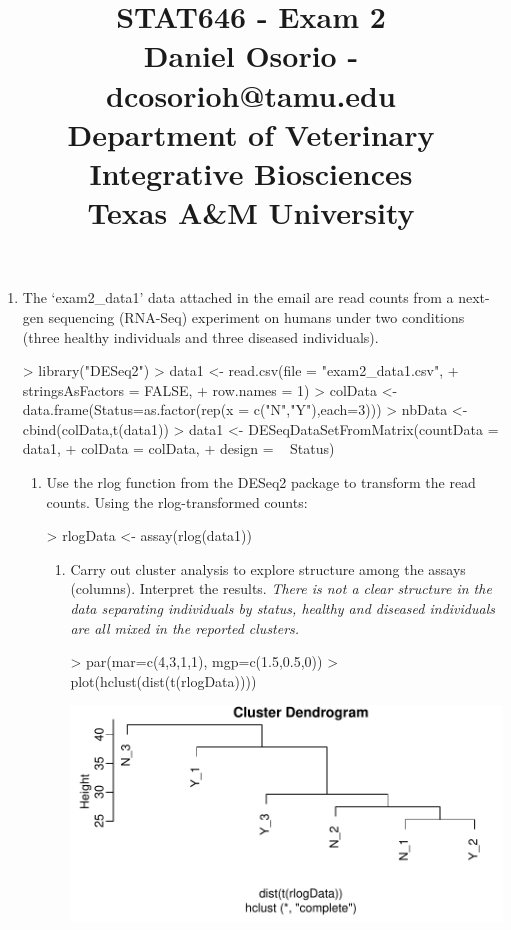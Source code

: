 \documentclass[12pt,a4paper]{paper}
\begin{document}
\title{STAT646 - Exam 2\\\small{Daniel Osorio - dcosorioh@tamu.edu\\Department of Veterinary Integrative Biosciences\\Texas A\&M University}}
\maketitle

\begin{enumerate}
\item The `exam2\_data1' data attached in the email are read counts from a next-gen sequencing (RNA-Seq) experiment on humans under two conditions (three healthy individuals and three diseased individuals).
\begin{Schunk}
\begin{Sinput}
> library("DESeq2")
> data1 <- read.csv(file = "exam2_data1.csv", 
+                   stringsAsFactors = FALSE, 
+                   row.names = 1)
> colData <- data.frame(Status=as.factor(rep(x = c("N","Y"),each=3)))
> nbData <- cbind(colData,t(data1))
> data1 <- DESeqDataSetFromMatrix(countData = data1, 
+                                 colData = colData, 
+                                 design = ~ Status)
\end{Sinput}
\end{Schunk}
\begin{enumerate}
\item Use the rlog function from the DESeq2 package to transform the read counts. Using the rlog-transformed counts:
\begin{Schunk}
\begin{Sinput}
> rlogData <- assay(rlog(data1))
\end{Sinput}
\end{Schunk}
\begin{enumerate}
\item Carry out cluster analysis to explore structure among the assays (columns). Interpret the results. \textit{There is not a clear structure in the data separating individuals by status, healthy and diseased individuals are all mixed in the reported clusters.}
\begin{Schunk}
\begin{Sinput}
> par(mar=c(4,3,1,1), mgp=c(1.5,0.5,0))
> plot(hclust(dist(t(rlogData))))
\end{Sinput}
\end{Schunk}
\includegraphics{Osorio_Daniel_E2-003}

\end{enumerate}
\end{enumerate}
\end{enumerate}
\end{document}
